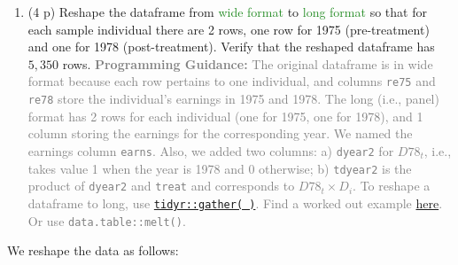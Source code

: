 \documentclass[
]{article}
\providecommand{\tightlist}{%
  \setlength{\itemsep}{0pt}\setlength{\parskip}{0pt}}
\begin{document}
\begin{enumerate}
\def\labelenumi{\alph{enumi}.}
\tightlist
\item
  (4 p) Reshape the dataframe from \textcolor{ForestGreen}{wide format}
  to \textcolor{ForestGreen}{long format} so that for each sample
  individual there are 2 rows, one row for 1975 (pre-treatment) and one
  for 1978 (post-treatment). Verify that the reshaped dataframe has
  \(5,350\) rows.
  \textcolor{gray}{\textbf{Programming Guidance:} The original dataframe is in wide format because each row pertains to one individual, and columns \texttt{re75} and \texttt{re78} store the individual's earnings in 1975 and 1978. The long (i.e., panel) format has 2 rows for each individual (one for 1975, one for 1978), and 1 column storing the earnings for the corresponding year. We named the earnings column \texttt{earns}. Also, we added two columns: a) \texttt{dyear2} for $D78_{t}$, i.e., takes value 1 when the year is 1978 and 0 otherwise; b) \texttt{tdyear2} is the product of \texttt{dyear2} and \texttt{treat} and corresponds to $D78_t \times D_i$. To reshape a dataframe to long, use \href{https://tidyr.tidyverse.org/reference/gather.html}{\texttt{tidyr::gather( )}}. Find a worked out example \href{https://uc-r.github.io/tidyr}{here}. Or use \texttt{data.table::melt()}.}\label{item:BAfter-reshape}
\end{enumerate}

We reshape the data as follows:
\end{document}
